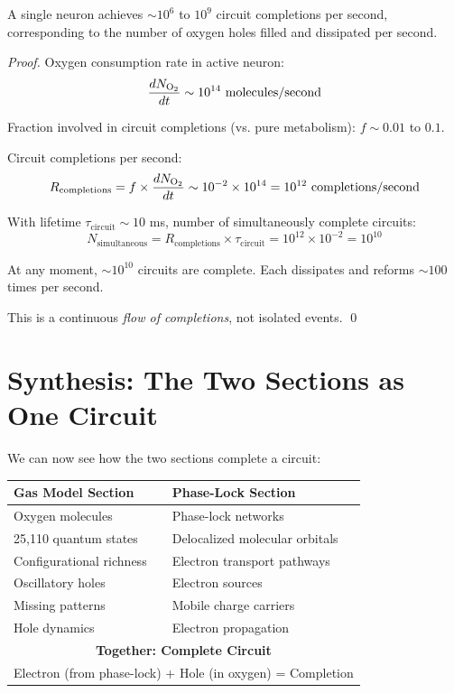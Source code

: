 \begin{corollary}
\label{cor:multiple_completions}
A single neuron achieves $\sim 10^6$ to $10^9$ circuit completions per second, corresponding to the number of oxygen holes filled and dissipated per second.
\end{corollary}

\begin{proof}
Oxygen consumption rate in active neuron:
\begin{equation}
\frac{dN_{\ce{O2}}}{dt} \sim 10^{14} \text{ molecules/second}
\end{equation}

Fraction involved in circuit completions (vs. pure metabolism): $f \sim 0.01$ to $0.1$.

Circuit completions per second:
\begin{equation}
R_{\text{completions}} = f \times \frac{dN_{\ce{O2}}}{dt} \sim 10^{-2} \times 10^{14} = 10^{12} \text{ completions/second}
\end{equation}

With lifetime $\tau_{\text{circuit}} \sim 10$ ms, number of simultaneously complete circuits:
\begin{equation}
N_{\text{simultaneous}} = R_{\text{completions}} \times \tau_{\text{circuit}} = 10^{12} \times 10^{-2} = 10^{10}
\end{equation}

At any moment, $\sim 10^{10}$ circuits are complete. Each dissipates and reforms $\sim 100$ times per second.

This is a continuous \textit{flow of completions}, not isolated events. \qed
\end{proof}

\section{Synthesis: The Two Sections as One Circuit}

We can now see how the two sections complete a circuit:

\begin{center}
\begin{tabular}{ll}
\toprule
\textbf{Gas Model Section} & \textbf{Phase-Lock Section} \\
\midrule
Oxygen molecules & Phase-lock networks \\
25,110 quantum states & Delocalized molecular orbitals \\
Configurational richness & Electron transport pathways \\
Oscillatory holes & Electron sources \\
Missing patterns & Mobile charge carriers \\
Hole dynamics & Electron propagation \\
\midrule
\multicolumn{2}{c}{\textbf{Together: Complete Circuit}} \\
\multicolumn{2}{c}{Electron (from phase-lock) + Hole (in oxygen) = Completion} \\
\bottomrule
\end{tabular}
\end{center}

